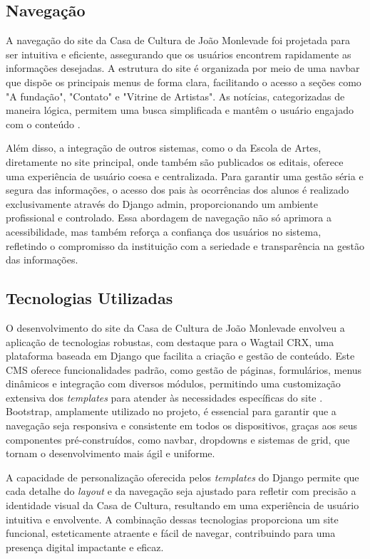 \subsection{Navegação}

A navegação do site da Casa de Cultura de João Monlevade foi projetada para ser intuitiva e eficiente, assegurando que os usuários encontrem rapidamente as informações desejadas. A estrutura do site é organizada por meio de uma navbar que dispõe os principais menus de forma clara, facilitando o acesso a seções como "A fundação", "Contato" e "Vitrine de Artistas". As notícias, categorizadas de maneira lógica, permitem uma busca simplificada e mantêm o usuário engajado com o conteúdo \cite{nielsen2012usability}. 

Além disso, a integração de outros sistemas, como o da Escola de Artes, diretamente no site principal, onde também são publicados os editais, oferece uma experiência de usuário coesa e centralizada. Para garantir uma gestão séria e segura das informações, o acesso dos pais às ocorrências dos alunos é realizado exclusivamente através do Django admin, proporcionando um ambiente profissional e controlado. Essa abordagem de navegação não só aprimora a acessibilidade, mas também reforça a confiança dos usuários no sistema, refletindo o compromisso da instituição com a seriedade e transparência na gestão das informações.

\subsection{Tecnologias Utilizadas}

O desenvolvimento do site da Casa de Cultura de João Monlevade envolveu a aplicação de tecnologias robustas, com destaque para o Wagtail CRX, uma plataforma baseada em Django que facilita a criação e gestão de conteúdo. Este \ac{CMS} oferece funcionalidades padrão, como gestão de páginas, formulários, menus dinâmicos e integração com diversos módulos, permitindo uma customização extensiva dos \textit{templates} para atender às necessidades específicas do site \cite{ellis2015coders}. Bootstrap, amplamente utilizado no projeto, é essencial para garantir que a navegação seja responsiva e consistente em todos os dispositivos, graças aos seus componentes pré-construídos, como navbar, dropdowns e sistemas de grid, que tornam o desenvolvimento mais ágil e uniforme. 

A capacidade de personalização oferecida pelos \textit{templates} do Django permite que cada detalhe do \textit{layout} e da navegação seja ajustado para refletir com precisão a identidade visual da Casa de Cultura, resultando em uma experiência de usuário intuitiva e envolvente. A combinação dessas tecnologias proporciona um site funcional, esteticamente atraente e fácil de navegar, contribuindo para uma presença digital impactante e eficaz.

